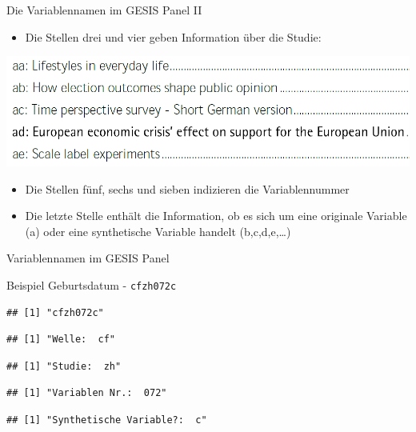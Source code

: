 \documentclass[ignorenonframetext,]{beamer}
\providecommand{\tightlist}{%
  \setlength{\itemsep}{0pt}\setlength{\parskip}{0pt}}
\begin{document}
\begin{frame}{Die Variablennamen im GESIS Panel II}

\begin{itemize}
\tightlist
\item
  Die Stellen drei und vier geben Information über die Studie:
\end{itemize}

\includegraphics{figure/examplestudies.PNG}

\begin{itemize}
\item
  Die Stellen fünf, sechs und sieben indizieren die Variablennummer
\item
  Die letzte Stelle enthält die Information, ob es sich um eine
  originale Variable (a) oder eine synthetische Variable handelt
  (b,c,d,e,\ldots{})
\end{itemize}

\end{frame}

\begin{frame}[fragile]{Variablennamen im GESIS Panel}

\begin{block}{Beispiel Geburtsdatum - \texttt{cfzh072c}}

\begin{verbatim}
## [1] "cfzh072c"
\end{verbatim}

\begin{verbatim}
## [1] "Welle:  cf"
\end{verbatim}

\begin{verbatim}
## [1] "Studie:  zh"
\end{verbatim}

\begin{verbatim}
## [1] "Variablen Nr.:  072"
\end{verbatim}

\begin{verbatim}
## [1] "Synthetische Variable?:  c"
\end{verbatim}

\end{block}

\end{frame}
\end{document}
